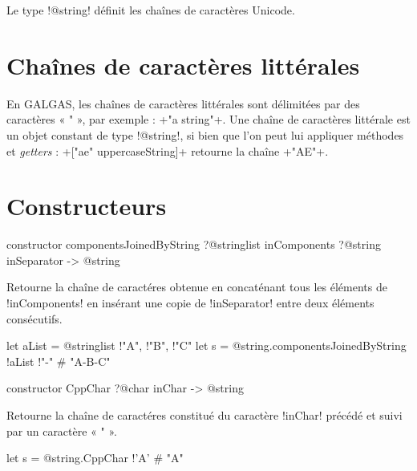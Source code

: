 

Le type \ggs!@string! définit les chaînes de caractères Unicode.

\section{Chaînes de caractères littérales}

En GALGAS, les chaînes de caractères littérales sont délimitées par des caractères « " », par exemple : \ggs+"a string"+. Une chaîne de caractères littérale est un objet constant de type \ggs!@string!, si bien que l'on peut lui appliquer méthodes et \emph{getters} : \ggs+["ae" uppercaseString]+ retourne la chaîne \ggs+"AE"+.







\section{Constructeurs}


\begin{galgasbox}
constructor componentsJoinedByString
   ?@stringlist inComponents
   ?@string inSeparator -> @string
\end{galgasbox}

Retourne la chaîne de caractéres obtenue en concaténant tous les éléments de \ggs!inComponents! en insérant une copie de \ggs!inSeparator! entre deux éléments consécutifs.

\begin{galgas}
let aList = @stringlist {!"A", !"B", !"C"}
let s = @string.componentsJoinedByString {!aList !"-"} # "A-B-C"
\end{galgas}





\begin{galgasbox}
constructor CppChar ?@char inChar -> @string
\end{galgasbox}

Retourne la chaîne de caractéres constitué du caractère \ggs!inChar! précédé et suivi par un caractère « " ».

\begin{galgas}
let s = @string.CppChar {!'A'} # "A"
\end{galgas}



